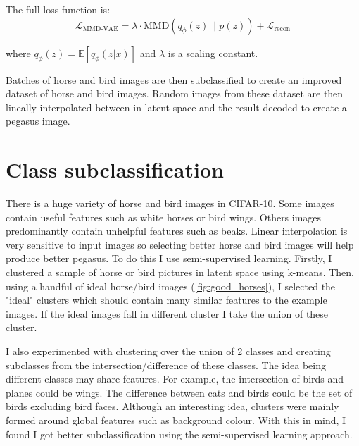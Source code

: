 \documentclass{article}
\begin{document}
The full loss function is:
\begin{equation}
    \mathcal{L}_\textrm{MMD-VAE} = \lambda \cdot \textrm{MMD}(q_\phi (z) \lVert p(z)) + \mathcal{L}_{\textrm{recon}}
\end{equation}

where $q_\phi(z) =  \mathbb{E}[q_\phi(z|x)]$ and $\lambda$ is a scaling constant.

Batches of horse and bird images are then subclassified to create an improved dataset of horse and bird images. Random images from these dataset are then lineally interpolated between in latent space and the result decoded to create a pegasus image. 

\section{Class subclassification}
There is a huge variety of horse and bird images in CIFAR-10. Some images contain useful features such as white horses or bird wings. Others images predominantly contain unhelpful features such as beaks. Linear interpolation is very sensitive to input images so selecting better horse and bird images will help produce better pegasus. To do this I use semi-supervised learning. Firstly, I clustered a sample of horse or bird pictures in latent space using k-means. Then, using a handful of ideal horse/bird images (\ref{fig:good_horses}), I selected the "ideal" clusters which should contain many similar features to the example images. If the ideal images fall in different cluster I take the union of these cluster.

I also experimented with clustering over the union of 2 classes and creating subclasses from the intersection/difference of these classes. The idea being different classes may share features. For example, the intersection of birds and planes could be wings. The difference between cats and birds could be the set of birds excluding bird faces. Although an interesting idea, clusters were mainly formed around global features such as background colour. With this in mind, I found I got better subclassification using the semi-supervised learning approach.
\end{document}
